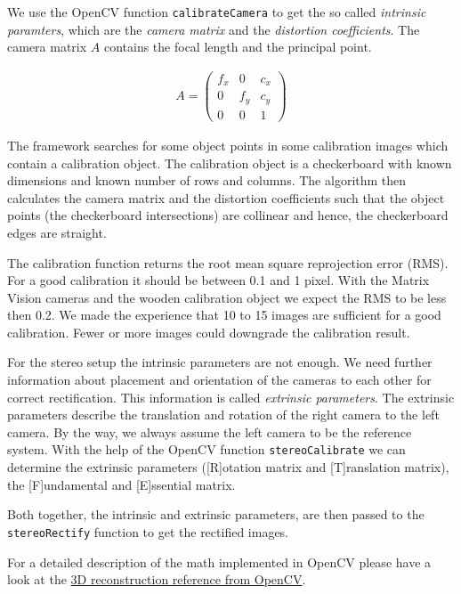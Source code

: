 \documentclass[11pt]{article}
\begin{document}
We use the OpenCV function \texttt{calibrateCamera} to get the so called  \emph{intrinsic paramters}, which are the \emph{camera matrix} and the \emph{distortion coefficients}. The camera matrix $A$ contains the focal length and the principal point. 

\begin{align*}
A=
\begin{pmatrix}
f_x & 0 & c_x\\
0 & f_y & c_y\\
0 & 0 & 1
\end{pmatrix}
\end{align*}


The framework searches for some object points  in some calibration images which contain a calibration object. The calibration object is a checkerboard with known dimensions and known number of rows and columns. The algorithm then calculates the camera matrix and the distortion coefficients such that the object points (the checkerboard intersections)  are collinear and hence, the checkerboard edges are straight.%

The calibration function returns the root mean square reprojection error (RMS). For a good calibration it should be between 0.1 and 1 pixel. With the Matrix Vision cameras and the wooden calibration object we expect the RMS to be less then 0.2. We made the experience that 10 to 15 images are sufficient for a good calibration. Fewer or more images could downgrade the calibration result. 


For the stereo setup the intrinsic parameters are not enough. We need further information about placement and orientation of the cameras to each other for correct rectification. This information is called \emph{extrinsic parameters}. The extrinsic parameters describe the translation and rotation of the right camera to the left camera. By the way, we always assume the left camera to be the reference system. With the help of the OpenCV function \texttt{stereoCalibrate} we can determine the extrinsic parameters ([R]otation matrix and [T]ranslation matrix), the [F]undamental and [E]ssential matrix.

Both together, the intrinsic and extrinsic parameters, are then passed to the \texttt{stereoRectify} function to get the rectified images.%

\bigskip
For a detailed description of the math implemented in OpenCV please have a look at the \href{http://docs.opencv.org/modules/calib3d/doc/camera_calibration_and_3d_reconstruction.html}{3D reconstruction reference from OpenCV}.
\bigskip
\end{document}
